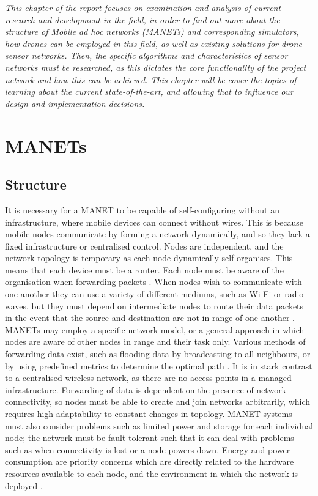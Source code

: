 \label{litreview}
\emph{This chapter of the report focuses on examination and analysis of current research and development in the field, in order to find out more about the structure of Mobile ad hoc networks (MANETs) and corresponding simulators, how drones can be employed in this field, as well as existing solutions for drone sensor networks. Then, the specific algorithms and characteristics of sensor networks must be researched, as this dictates the core functionality of the project network and how this can be achieved. This chapter will be cover the topics of learning about the current state-of-the-art, and allowing that to influence our design and implementation decisions.}

\section{MANETs}

\subsection{Structure}
It is necessary for a MANET to be capable of self-configuring without an infrastructure, where mobile devices can connect without wires. This is because mobile nodes communicate by forming a network dynamically, and so they lack a fixed infrastructure or centralised control. Nodes are independent, and the network topology is temporary as each node dynamically self-organises. This means that each device must be a router. Each node must be aware of the organisation when forwarding packets \cite{jaydipsen2010}. When nodes wish to communicate with one another they can use a variety of different mediums, such as Wi-Fi or radio waves, but they must depend on intermediate nodes to route their data packets in the event that the source and destination are not in range of one another \cite{ramramathanjasonredi2012}.
MANETs may employ a specific network model, or a general approach in which nodes are aware of other nodes in range and their task only. Various methods of forwarding data exist, such as flooding data by broadcasting to all neighbours, or by using predefined metrics to determine the optimal path \cite{jaydipsen2010}. It is in stark contrast to a centralised wireless network, as there are no access points in a managed infrastructure. Forwarding of data is dependent on the presence of network connectivity, so nodes must be able to create and join networks arbitrarily, which requires high adaptability to constant changes in topology. MANET systems must also consider problems such as limited power and storage for each individual node; the network must be fault tolerant such that it can deal with problems such as when connectivity is lost or a node powers down. Energy and power consumption are priority concerns which are directly related to the hardware resources available to each node, and the environment in which the network is deployed \cite{sajshahmina2012}.

